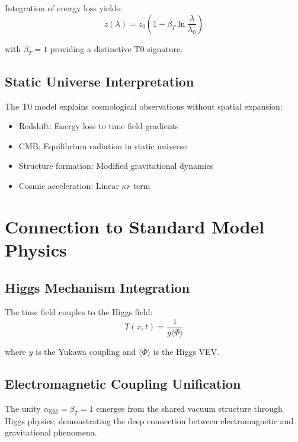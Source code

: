 \documentclass[twocolumn,aps,prl]{revtex4-2}
\newcommand{\Tfieldt}{T(x,t)}
\begin{document}
	Integration of energy loss yields:
	\begin{equation}
		z(\lambda) = z_0\left(1 + \beta_T \ln\frac{\lambda}{\lambda_0}\right)
		\label{eq:wavelength_dependent_redshift}
	\end{equation}
	
	with \(\beta_T = 1\) providing a distinctive T0 signature.
	
	\subsection{Static Universe Interpretation}
	\label{subsec:static_universe}
	
	The T0 model explains cosmological observations without spatial expansion:
	\begin{itemize}
		\item Redshift: Energy loss to time field gradients
		\item CMB: Equilibrium radiation in static universe
		\item Structure formation: Modified gravitational dynamics
		\item Cosmic acceleration: Linear \(\kappa r\) term
	\end{itemize}
	
	\section{Connection to Standard Model Physics}
	\label{sec:standard_model_connection}
	
	\subsection{Higgs Mechanism Integration}
	\label{subsec:higgs_integration}
	
	The time field couples to the Higgs field:
	\begin{equation}
		\Tfieldt = \frac{1}{y\langle\Phi\rangle}
		\label{eq:time_higgs_connection}
	\end{equation}
	
	where \(y\) is the Yukawa coupling and \(\langle\Phi\rangle\) is the Higgs VEV.
	
	\subsection{Electromagnetic Coupling Unification}
	\label{subsec:em_coupling_unification}
	
	The unity \(\alpha_{\text{EM}} = \beta_T = 1\) emerges from the shared vacuum structure through Higgs physics, demonstrating the deep connection between electromagnetic and gravitational phenomena.
	
\end{document}
